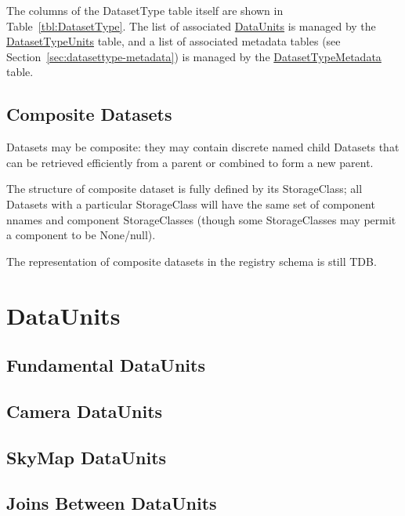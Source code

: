 \documentclass[DM,toc]{lsstdoc}
\newcommand{\tblref}[1]{\hyperref[tbl:#1]{#1}}
\newcommand{\coltable}[1]{
    \begin{table}[!htb]
        {\footnotesize
        }
        \caption{#1 Columns}
        \label{tbl:#1}
    \end{table}
}
\begin{document}
The columns of the DatasetType table itself are shown in Table~\ref{tbl:DatasetType}.
The list of associated \hyperref[sec:dataunits]{DataUnits} is managed by the \tblref{DatasetTypeUnits} table, and a list of associated metadata tables (see Section~\ref{sec:datasettype-metadata}) is managed by the \tblref{DatasetTypeMetadata} table.

\coltable{DatasetType}
\coltable{DatasetTypeUnits}
\coltable{DatasetTypeMetadata}


\subsection{Composite Datasets}
\label{sec:composite-datasets}

Datasets may be composite: they may contain discrete named child Datasets that can be retrieved efficiently from a parent or combined to form a new parent.

The structure of composite dataset is fully defined by its StorageClass; all Datasets with a particular StorageClass will have the same set of component nnames and component StorageClasses (though some StorageClasses may permit a component to be None/null).

The representation of composite datasets in the registry schema is still TDB.

\section{DataUnits}
\label{sec:dataunits}

\subsection{Fundamental DataUnits}
\label{sec:fundamental-dataunits}

\subsection{Camera DataUnits}
\label{sec:camera-dataunits}

\subsection{SkyMap DataUnits}
\label{sec:skymap-dataunits}

\subsection{Joins Between DataUnits}
\label{sec:joins-between-dataunits}
\end{document}
